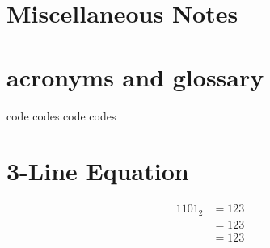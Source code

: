 \section{Miscellaneous Notes}









\section{acronyms and glossary}

\gls{code} %
\glspl{code} %
\Gls{code} %
\Glspl{code} %


\section{3-Line Equation}
\begin{align}
	\label{03:eq:identity_example}
	1101_2 &= 123 \\
	\nonumber
	&= 123 \\
	\nonumber
	&= 123
\end{align}


